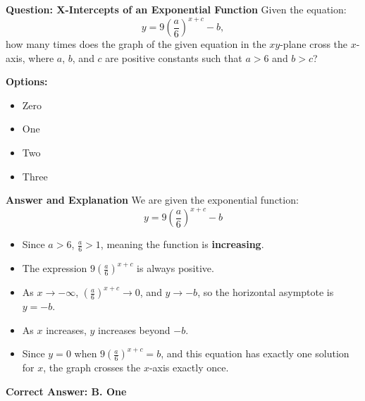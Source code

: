 \documentclass{beamer}
\begin{document}
\begin{frame}{\textbf{Question: X-Intercepts of an Exponential Function}}
Given the equation:
\[
y = 9\left(\frac{a}{6}\right)^{x + c} - b,
\]
how many times does the graph of the given equation in the $xy$-plane cross the $x$-axis, where $a$, $b$, and $c$ are positive constants such that $a > 6$ and $b > c$?

\textbf{Options:}
\begin{itemize}
    \item[A.] Zero
    \item[B.] One
    \item[C.] Two
    \item[D.] Three
\end{itemize}
\end{frame}

\begin{frame}{\textbf{Answer and Explanation}}
We are given the exponential function:
\[
y = 9\left(\frac{a}{6}\right)^{x + c} - b
\]

\begin{itemize}
    \item Since $a > 6$, $\frac{a}{6} > 1$, meaning the function is \textbf{increasing}.
    \item The expression $9\left(\frac{a}{6}\right)^{x + c}$ is always positive.
    \item As $x \to -\infty$, $\left(\frac{a}{6}\right)^{x + c} \to 0$, and $y \to -b$, so the horizontal asymptote is $y = -b$.
    \item As $x$ increases, $y$ increases beyond $-b$.
    \item Since $y = 0$ when $9\left(\frac{a}{6}\right)^{x + c} = b$, and this equation has exactly one solution for $x$, the graph crosses the $x$-axis exactly once.
\end{itemize}

\textbf{Correct Answer: B. One}
\end{frame}
\end{document}
